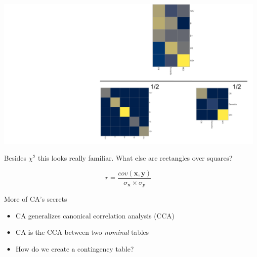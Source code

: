 \documentclass[
  ignorenonframetext,
]{beamer}
\providecommand{\tightlist}{%
  \setlength{\itemsep}{0pt}\setlength{\parskip}{0pt}}
\begin{document}
\begin{frame}

\includegraphics{../images/Deviations_Over_Familiar.png}

Besides \(\chi^2\) this looks really familiar. What else are rectangles
over squares?

\end{frame}

\begin{frame}

\begingroup\Huge

\begin{equation*}
r = \frac{cov(\mathbf{x},\mathbf{y})}{\sigma_{\mathbf{x}} \times \sigma_{\mathbf{y}}}
\end{equation*} \endgroup

\end{frame}

\begin{frame}{More of CA's secrets}
\protect\hypertarget{more-of-cas-secrets}{}

\begin{itemize}[<+->]
\tightlist
\item
  CA generalizes canonical correlation analysis (CCA)
\item
  CA is the CCA between two \emph{nominal} tables
\item
  How do we create a contingency table?
\end{itemize}

\end{frame}
\end{document}
